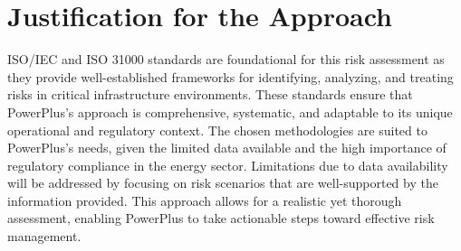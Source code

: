 \section{Justification for the Approach}

ISO/IEC and ISO 31000 standards are foundational for this risk assessment as they provide well-established frameworks for identifying, analyzing, and treating risks in critical infrastructure environments. 
These standards ensure that PowerPlus’s approach is comprehensive, systematic, and adaptable to its unique operational and regulatory context. The chosen methodologies are suited to PowerPlus’s needs, given the limited data available and the high importance of regulatory compliance in the energy sector.
Limitations due to data availability will be addressed by focusing on risk scenarios that are well-supported by the information provided. This approach allows for a realistic yet thorough assessment, enabling PowerPlus to take actionable steps toward effective risk management.
